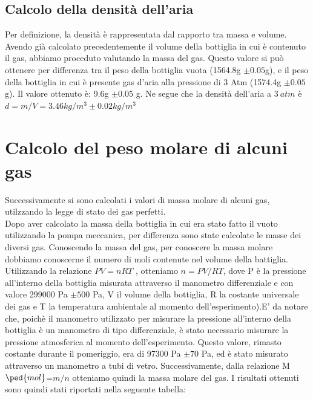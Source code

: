 \documentclass[a4paper,11pt]{article}
\begin{document}
\subsection{Calcolo della densità dell'aria}
Per definizione, la densità è rappresentata dal rapporto tra massa e volume. Avendo già calcolato precedentemente il volume della bottiglia in cui è contenuto il gas, abbiamo proceduto valutando la massa del gas. Questo valore si può ottenere per differenza tra il peso della bottiglia vuota (1564.8g $\pm 0.05$g), e il peso della bottiglia in cui è presente gas d'aria alla pressione di 3 Atm (1574.4g $\pm 0.05$g). Il valore ottenuto è: 9.6g $\pm 0.05$ g.
Ne segue che la densità dell'aria a $3 ~atm$ è  $d= m/V= 3.46 kg/m^3 \pm 0.02kg/m^3$  

\section{Calcolo del peso molare di alcuni gas}
Successivamente si sono calcolati i valori di massa molare di alcuni gas, utilzzando la legge di stato dei gas perfetti. \\Dopo aver calcolato la massa della bottiglia in cui era stato fatto il vuoto utilizzando la pompa meccanica, per differenza sono state calcolate le masse dei diversi gas. Conoscendo la massa del gas, per conoscere la massa molare dobbiamo conoscerne il numero di moli contenute nel volume della battiglia. Utilizzando la relazione $PV=nRT$ , otteniamo $n=PV/RT$, dove P è la pressione all'interno della bottiglia misurata attraverso il manometro differenziale e con valore 299000 Pa $\pm500$ Pa, V il volume della bottiglia, R la costante universale dei gas e T la temperatura ambientale al momento dell'esperimento).E' da notare che, poichè il manometro utilizzato per misurare la pressione all'interno della bottiglia è un manometro di tipo differenziale, è stato necessario misurare la pressione atmosferica al momento dell'esperimento. Questo valore, rimasto costante durante il pomeriggio, era di 97300 Pa $\pm70$ Pa, ed è stato misurato attraverso un manometro a tubi di vetro. Successivamente, dalla relazione M$\ped{mol}$=$m/n$ otteniamo quindi la massa molare del gas. I risultati ottenuti sono quindi stati riportati nella seguente tabella: 
\hspace{-140pt}
\end{document}
